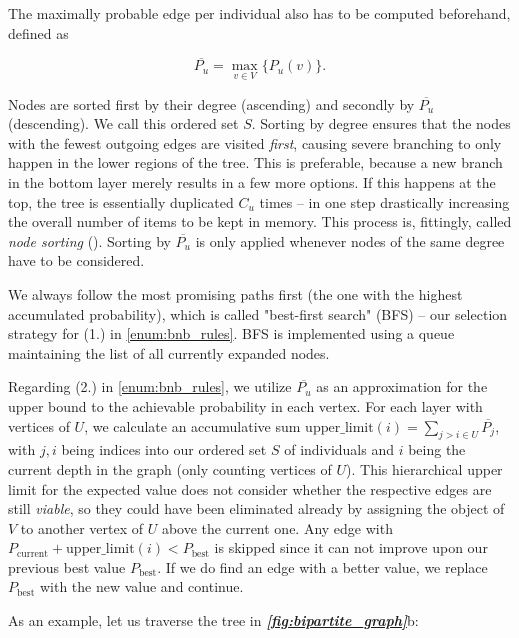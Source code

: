 \documentclass[9pt,lineno]{elife}
\newcommand{\figref}[1]{\textit{\textbf{\ref{#1}}}}
\begin{document}
\begin{appendixbox}
The maximally probable edge per individual also has to be computed beforehand, defined as

$$ \overline{P_u} = \max_{v\in V}\{ P_u(v) \}. $$

Nodes are sorted first by their degree (ascending) and secondly by $\overline{P_u}$ (descending). We call this ordered set $S$. Sorting by degree ensures that the nodes with the fewest outgoing edges are visited \textit{first}, causing severe branching to only happen in the lower regions of the tree. This is preferable, because a new branch in the bottom layer merely results in a few more options. If this happens at the top, the tree is essentially duplicated $C_u$ times -- in one step drastically increasing the overall number of items to be kept in memory. This process is, fittingly, called \textit{node sorting} (\cite{zhang1996branch}). Sorting by $\overline{P_u}$ is only applied whenever nodes of the same degree have to be considered. 

We always follow the most promising paths first (the one with the highest accumulated probability), which is called "best-first search" (BFS) -- our selection strategy for (1.) in \ref{enum:bnb_rules}. BFS is implemented using a queue maintaining the list of all currently expanded nodes.

Regarding (2.) in \ref{enum:bnb_rules}, we utilize $\overline{P_u}$ as an approximation for the upper bound to the achievable probability in each vertex. For each layer with vertices of $U$, we calculate an accumulative sum $\mathrm{upper\_limit}(i) = \sum_{j > i \in U}  \overline{P_j}$, with $j,i$ being indices into our ordered set $S$ of individuals and $i$ being the current depth in the graph (only counting vertices of $U$). This hierarchical upper limit for the expected value does not consider whether the respective edges are still \textit{viable}, so they could have been eliminated already by assigning the object of $V$ to another vertex of $U$ above the current one. Any edge with $P_\mathrm{current} + \mathrm{upper\_limit}(i) < P_\mathrm{best}$ is skipped since it can not improve upon our previous best value $P_\mathrm{best}$. If we do find an edge with a better value, we replace $P_\mathrm{best}$ with the new value and continue.

As an example, let us traverse the tree in \figref{fig:bipartite_graph}b: 


\end{appendixbox}
\end{document}
